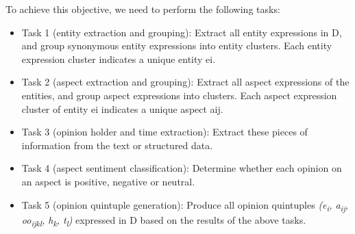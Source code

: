                                                                                                                                                                                                                                                                                                                                                                                                                                                                                                                                                                                                                                                                                                                                                                                                                                                                                                                                                                                                                                                                                                                                                                                                                                                                                                                                                                                                           

To achieve this objective, we need to perform the following tasks:
\begin{itemize}
	\item Task  1 (entity extraction and grouping): Extract all entity expressions in D, and group synonymous entity expressions into entity clusters. Each entity expression cluster indicates a unique entity ei.
	\item Task  2 (aspect extraction and grouping): Extract all aspect expressions of the entities, and group aspect expressions into clusters. Each aspect expression cluster of entity ei indicates a unique aspect aij.
	\item Task  3 (opinion holder and time extraction): Extract these pieces of information from the text or structured data.
	\item Task  4 (aspect sentiment classification): Determine whether each opinion on an aspect is positive, negative or neutral.
	\item Task  5 (opinion quintuple generation): Produce all opinion quintuples \emph{(e\textsubscript{i}, a\textsubscript{ij}, oo\textsubscript{ijkl}, h\textsubscript{k}, t\textsubscript{l})} expressed in D based on the results of the above tasks.
\end{itemize}

